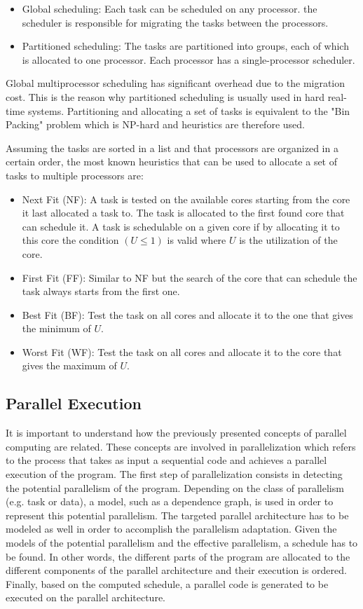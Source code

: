 \begin{itemize}
\item Global scheduling: Each task can be scheduled on any processor. the scheduler is responsible for migrating the tasks between the processors.
\item Partitioned scheduling: The tasks are partitioned into groups, each of which is allocated to one processor. Each processor has a single-processor scheduler. 
\end{itemize}
Global multiprocessor scheduling has significant overhead due to the migration cost. This is the reason why partitioned scheduling is usually used in hard real-time systems. Partitioning and allocating a set of tasks is equivalent to the "Bin Packing" problem which is NP-hard and heuristics are therefore used. 

Assuming the tasks are sorted in a list and that processors are organized in a certain order, the most known heuristics that can be used to allocate a set of tasks to multiple processors are:

\begin{itemize}
\item Next Fit (NF): A task is tested on the available cores starting from the core it last allocated a task to. The task is allocated to the first found core that can schedule it. A task is schedulable on a given core if by allocating it to this core the condition $(U\leq1)$ is valid where $U$ is the utilization of the core.
\item First Fit (FF): Similar to NF but the search of the core that can schedule the task always starts from the first one.
\item Best Fit (BF): Test the task on all cores and allocate it to the one that gives the minimum of $U$.
\item Worst Fit (WF): Test the task on all cores and allocate it to the core that gives the maximum of $U$.
\end{itemize}
  
\subsection{Parallel Execution}

It is important to understand how the previously presented concepts of parallel computing are related. These concepts are involved in parallelization which refers to the process that takes as input a sequential code and achieves a parallel execution of the program. The first step of parallelization consists in detecting the potential parallelism of the program. Depending on the class of parallelism (e.g. task or data), a model, such as a dependence graph, is used in order to represent this potential parallelism. The targeted parallel architecture has to be modeled as well in order to accomplish the parallelism adaptation. Given the models of the potential parallelism and the effective parallelism, a schedule has to be found. In other words, the different parts of the program are allocated to the different components of the parallel architecture and their execution is ordered. Finally, based on the computed schedule, a parallel code is generated to be executed on the parallel architecture.  

